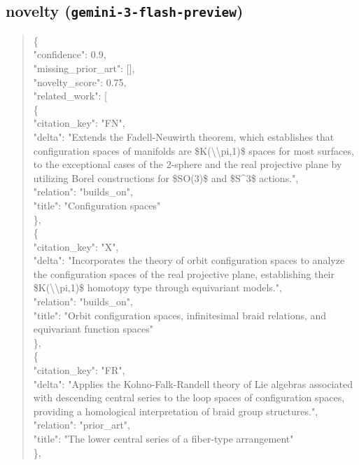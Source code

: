 \documentclass[11pt]{article}
\begin{document}
\subsection*{novelty (\texttt{gemini-3-flash-preview})}
\begin{quote}\small\ttfamily\raggedright
\{\\
  "confidence": 0.9,\\
  "missing\_prior\_art": [],\\
  "novelty\_score": 0.75,\\
  "related\_work": [\\
    \{\\
      "citation\_key": "FN",\\
      "delta": "Extends the Fadell-Neuwirth theorem, which establishes that configuration spaces of manifolds are \$K(\textbackslash{}\textbackslash{}pi,1)\$ spaces for most surfaces, to the exceptional cases of the 2-sphere and the real projective plane by utilizing Borel constructions for \$SO(3)\$ and \$S\^{}3\$ actions.",\\
      "relation": "builds\_on",\\
      "title": "Configuration spaces"\\
    \},\\
    \{\\
      "citation\_key": "X",\\
      "delta": "Incorporates the theory of orbit configuration spaces to analyze the configuration spaces of the real projective plane, establishing their \$K(\textbackslash{}\textbackslash{}pi,1)\$ homotopy type through equivariant models.",\\
      "relation": "builds\_on",\\
      "title": "Orbit configuration spaces, infinitesimal braid relations, and equivariant function spaces"\\
    \},\\
    \{\\
      "citation\_key": "FR",\\
      "delta": "Applies the Kohno-Falk-Randell theory of Lie algebras associated with descending central series to the loop spaces of configuration spaces, providing a homological interpretation of braid group structures.",\\
      "relation": "prior\_art",\\
      "title": "The lower central series of a fiber-type arrangement"\\
    \},\\

\end{quote}
\end{document}
